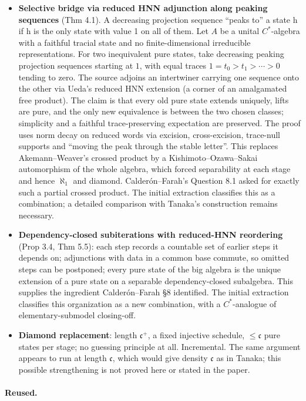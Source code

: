 \documentclass[11pt]{article}
\begin{document}
\begin{itemize}
\item \textbf{Selective bridge via reduced HNN adjunction along peaking sequences} (Thm 4.1). A decreasing projection sequence ``peaks to'' a state h if h is the only state with value 1 on all of them. Let $A$ be a unital $C^*$-algebra with a faithful tracial state and no finite-dimensional irreducible representations. For two inequivalent pure states, take decreasing peaking projection sequences starting at $1$, with equal traces $1=t_0>t_1>\cdots>0$ tending to zero. The source adjoins an intertwiner carrying one sequence onto the other via Ueda's reduced HNN extension (a corner of an amalgamated free product). The claim is that every old pure state extends uniquely, lifts are pure, and the only new equivalence is between the two chosen classes; simplicity and a faithful trace-preserving expectation are preserved. The proof uses norm decay on reduced words via excision, cross-excision, trace-null supports and ``moving the peak through the stable letter''. This replaces Akemann--Weaver's crossed product by a Kishimoto--Ozawa--Sakai automorphism of the whole algebra, which forced separability at each stage and hence $\aleph_{1}$ and diamond. Calderón--Farah's Question 8.1 asked for exactly such a partial crossed product. The initial extraction classifies this as a combination; a detailed comparison with Tanaka's construction remains necessary.
\item \textbf{Dependency-closed subiterations with reduced-HNN reordering} (Prop 3.4, Thm 5.5): each step records a countable set of earlier steps it depends on; adjunctions with data in a common base commute, so omitted steps can be postponed; every pure state of the big algebra is the unique extension of a pure state on a separable dependency-closed subalgebra. This supplies the ingredient Calderón--Farah \S{}8 identified. The initial extraction classifies this organization as a new combination, with a $C^*$-analogue of elementary-submodel closing-off.
\item \textbf{Diamond replacement}: length $\mathfrak{c}^{+}$, a fixed injective schedule, $\le \mathfrak{c}$ pure states per stage; no guessing principle at all. Incremental. The same argument appears to run at length $\mathfrak{c}$, which would give density $\mathfrak{c}$ as in Tanaka; this possible strengthening is not proved here or stated in the paper.
\end{itemize}

\paragraph{Reused.}
\end{document}
